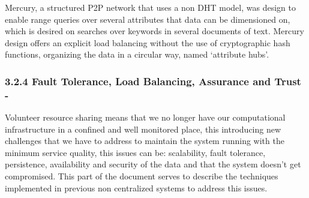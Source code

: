 Mercury\cite{Bharambe}, a structured P2P network that uses a non DHT model, was design to enable range queries over several attributes that data can be dimensioned on, which is desired on searches over keywords in several documents of text. Mercury design offers an explicit load balancing without the use of cryptographic hash functions, organizing the data in a circular way, named `attribute hubs'.








\subsubsection{3.2.4 Fault Tolerance, Load Balancing, Assurance and Trust -}

Volunteer resource sharing means that we no longer have our computational infrastructure in a confined and well monitored place, this introducing new challenges that we have to address \cite{Koloniari2005} to maintain the system running with the minimum service quality, this issues can be: scalability, fault tolerance, persistence, availability and security\cite{Wallach} of the data and that the system doesn't get compromised. This part of the document serves to describe the techniques implemented in previous non centralized systems to address this issues.

